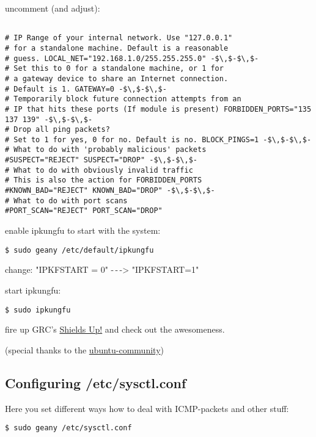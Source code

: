 \documentclass{article}
\begin{document}
 uncomment (and adjust):
\begin{lstlisting}

# IP Range of your internal network. Use "127.0.0.1" 
# for a standalone machine. Default is a reasonable 
# guess. LOCAL_NET="192.168.1.0/255.255.255.0" -$\,$-$\,$- 
# Set this to 0 for a standalone machine, or 1 for 
# a gateway device to share an Internet connection. 
# Default is 1. GATEWAY=0 -$\,$-$\,$- 
# Temporarily block future connection attempts from an 
# IP that hits these ports (If module is present) FORBIDDEN_PORTS="135 137 139" -$\,$-$\,$- 
# Drop all ping packets? 
# Set to 1 for yes, 0 for no. Default is no. BLOCK_PINGS=1 -$\,$-$\,$- 
# What to do with 'probably malicious' packets 
#SUSPECT="REJECT" SUSPECT="DROP" -$\,$-$\,$- 
# What to do with obviously invalid traffic 
# This is also the action for FORBIDDEN_PORTS 
#KNOWN_BAD="REJECT" KNOWN_BAD="DROP" -$\,$-$\,$- 
# What to do with port scans 
#PORT_SCAN="REJECT" PORT_SCAN="DROP"
\end{lstlisting}



 enable ipkungfu to start with the system:
\begin{lstlisting}
$ sudo geany /etc/default/ipkungfu
\end{lstlisting}



 change: "IPKFSTART = 0" -$\,$-$\,$-> "IPKFSTART=1" 


 start ipkungfu:
\begin{lstlisting}
$ sudo ipkungfu
\end{lstlisting}



 fire up GRC's \href{https://www.grc.com/x/ne.dll?bh0bkyd2}{Shields Up!} and check out the awesomeness.


 (special thanks to the \href{https://help.ubuntu.com/community/firewall/ipkungfu}{ubuntu-community})
\subsection{Configuring /etc/sysctl.conf}


 Here you set different ways how to deal with ICMP-packets and other stuff:
\begin{lstlisting}
$ sudo geany /etc/sysctl.conf
\end{lstlisting}
\end{document}
